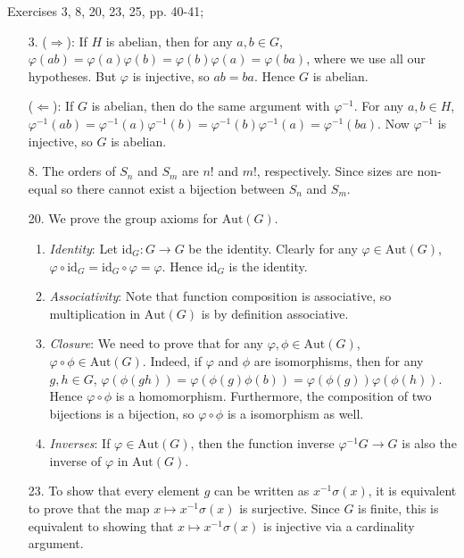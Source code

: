 \documentclass[12pt]{article}
\theoremstyle{remark}
\theoremstyle{named}
\begin{document}
Exercises 3, 8, 20, 23, 25, pp. 40-41;

\begin{enumerate}
    \item [3.] ($\Rightarrow$): If $H$ is abelian, then for any $a, b \in G$, $\varphi(ab) = \varphi(a)\varphi(b) = \varphi(b)\varphi(a) = \varphi(ba)$, where we use all our hypotheses. But $\varphi$ is injective, so $ab = ba$. Hence $G$ is abelian.
    
    ($\Leftarrow$): If $G$ is abelian, then do the same argument with $\varphi^{-1}$. For any $a, b \in H$, $\varphi^{-1}(ab) = \varphi^{-1}(a) \varphi^{-1}(b) = \varphi^{-1}(b)\varphi^{-1}(a) = \varphi^{-1}(ba)$. Now $\varphi^{-1}$ is injective, so $G$ is abelian.
    \item [8.] The orders of $S_n$ and $S_m$ are $n!$ and $m!$, respectively. Since sizes are non-equal so there cannot exist a bijection between $S_n$ and $S_m$.
    
    \item [20.] We prove the group axioms for $\text{Aut}(G)$.
    
    \begin{enumerate}
        \item \textit{Identity}: Let $\text{id}_G : G \to G$ be the identity. Clearly for any $\varphi \in \text{Aut}(G)$, $\varphi \circ \text{id}_G = \text{id}_G \circ \varphi = \varphi$. Hence $\text{id}_G$ is the identity. 
        \item \textit{Associativity}: Note that function composition is associative, so multiplication in $\text{Aut}(G)$ is by definition associative.
        \item \textit{Closure}: We need to prove that for any $\varphi, \phi \in \text{Aut}(G)$, $\varphi \circ \phi \in \text{Aut}(G)$. Indeed, if $\varphi$ and $\phi$ are isomorphisms, then for any $g, h \in G$, $\varphi(\phi(gh)) = \varphi(\phi(g)\phi(b)) = \varphi(\phi(g)) \varphi(\phi(h))$. Hence $\varphi \circ \phi$ is a homomorphism. Furthermore, the composition of two bijections is a bijection, so $\varphi \circ \phi$ is a isomorphism as well.
        \item \textit{Inverses}: If $\varphi \in \text{Aut}(G)$, then the function inverse $\varphi^{-1} G \to G$ is also the inverse of $\varphi$ in $\text{Aut}(G)$.
    \end{enumerate}

    \item [23.] To show that every element $g$ can be written as $x^{-1} \sigma(x)$, it is equivalent to prove that the map $x \mapsto x^{-1}\sigma(x)$ is surjective. Since $G$ is finite, this is equivalent to showing that $x \mapsto x^{-1}\sigma(x)$ is injective via a cardinality argument.
    

\end{enumerate}
\end{document}
